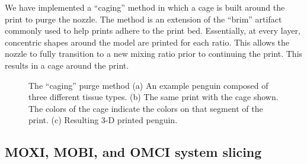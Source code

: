We have implemented a ``caging'' method in which a cage is built around the print to purge the nozzle. The method is an extension of the ``brim'' artifact commonly used to help prints adhere to the print bed. Essentially, at every layer, concentric shapes around the model are printed for each ratio. This allows the nozzle to fully transition to a new mixing ratio prior to continuing the print. This results in a cage around the print. 

\begin{figure}
	\begin{center}
	\end{center}
	\caption{The ``caging'' purge method (a) An example penguin composed of three different tissue types. (b) The same print with the cage shown. The colors of the cage indicate the colors on that segment of the print. (c) Resulting 3-D printed penguin. } 
	\label{fig:caging}
\end{figure} 

\subsection{MOXI, MOBI, and OMCI system slicing}



